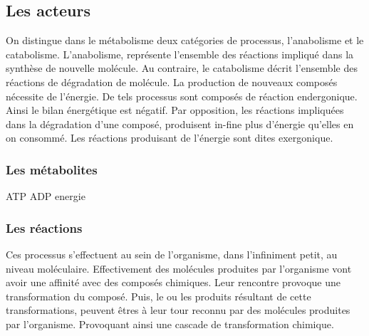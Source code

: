 \begin{refsection}

    \subsection{Les acteurs}
    
    On distingue dans le métabolisme deux catégories de processus, l'anabolisme et le catabolisme. L'anabolisme, représente l'ensemble des réactions impliqué dans la synthèse de nouvelle molécule. Au contraire, le catabolisme décrit l'ensemble des réactions de dégradation de molécule. La production de nouveaux composés nécessite de l'énergie. De tels processus sont composés de réaction endergonique. Ainsi le bilan énergétique est négatif. Par opposition, les réactions impliquées dans la dégradation d'une composé, produisent in-fine plus d'énergie qu'elles en on consommé. Les réactions produisant de l'énergie sont dites exergonique.
    
    \subsubsection{Les métabolites}
    ATP ADP energie
    
    
    \subsubsection{Les réactions}
    Ces processus s'effectuent au sein de l'organisme, dans l'infiniment petit, au niveau moléculaire. Effectivement des molécules produites par l'organisme vont avoir une affinité avec des composés chimiques. Leur rencontre provoque une transformation du composé. Puis, le ou les produits résultant de cette transformations, peuvent êtres à leur tour reconnu par des molécules produites par l'organisme. Provoquant ainsi une cascade de transformation chimique.
    

\end{refsection}
